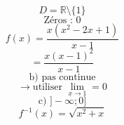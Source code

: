 \documentclass{article}
\begin{document}
\[ D = \mathbb{R} \setminus \{1\} \]
\[ \text{Zéros : } 0 \]
\[ f(x) = \frac{x(x^2 - 2x + 1)}{x - 1} \]
\[ = \frac{x(x - 1)^2}{x - 1} \]
\[\text{b) pas continue}\]
\[ \rightarrow \text{utiliser } \lim_{x \rightarrow 1} = 0 \]
\[\text{c) } ]-\infty; 0]\]
\[ f^{-1}(x) = \sqrt{x^2 + x} \]
\end{document}
